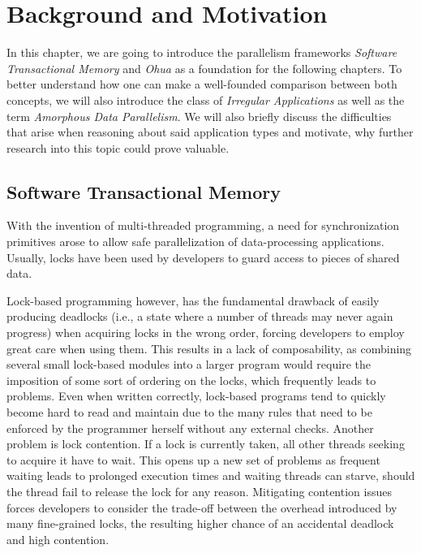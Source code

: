 %
\chapter{Background and Motivation}%
\label{sec:background}

In this chapter, we are going to introduce the parallelism frameworks \emph{Software Transactional Memory} and \emph{Ohua} as a foundation for the following chapters.
To better understand how one can make a well-founded comparison between both concepts, we will also introduce the class of \emph{Irregular Applications} as well as the term \emph{Amorphous Data Parallelism}.
We will also briefly discuss the difficulties that arise when reasoning about said application types and motivate, why further research into this topic could prove valuable.

\section{Software Transactional Memory}
\label{sec:background:stm}

With the invention of multi-threaded programming, a need for synchronization primitives arose to allow safe parallelization of data-processing applications.
Usually, locks have been used by developers to guard access to pieces of shared data.

Lock-based programming however, has the fundamental drawback of easily producing deadlocks (i.e., a state where a number of threads may never again progress) when acquiring locks in the wrong order, forcing developers to employ great care when using them.
This results in a lack of composability, as combining several small lock-based modules into a larger program would require the imposition of some sort of ordering on the locks, which frequently leads to problems.
Even when written correctly, lock-based programs tend to quickly become hard to read and maintain due to the many rules that need to be enforced by the programmer herself without any external checks.
Another problem is lock contention.
If a lock is currently taken, all other threads seeking to acquire it have to wait.
This opens up a new set of problems as frequent waiting leads to prolonged execution times and waiting threads can starve, should the thread fail to release the lock for any reason.
Mitigating contention issues forces developers to consider the trade-off between the overhead introduced by many fine-grained locks, the resulting higher chance of an accidental deadlock and high contention.

